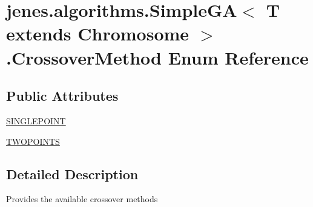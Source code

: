 \hypertarget{enumjenes_1_1algorithms_1_1_simple_g_a_3_01_t_01extends_01_chromosome_01_4_1_1_crossover_method}{\section{jenes.\-algorithms.\-Simple\-G\-A$<$ T extends Chromosome $>$.Crossover\-Method Enum Reference}
\label{enumjenes_1_1algorithms_1_1_simple_g_a_3_01_t_01extends_01_chromosome_01_4_1_1_crossover_method}
}
\subsection*{Public Attributes}
\begin{DoxyCompactItemize}
\item 
\hyperlink{enumjenes_1_1algorithms_1_1_simple_g_a_3_01_t_01extends_01_chromosome_01_4_1_1_crossover_method_a0dba044ab40298639e47034fda066ece}{S\-I\-N\-G\-L\-E\-P\-O\-I\-N\-T}
\item 
\hyperlink{enumjenes_1_1algorithms_1_1_simple_g_a_3_01_t_01extends_01_chromosome_01_4_1_1_crossover_method_ad25c14da6b790cbaeac60e7b0a619144}{T\-W\-O\-P\-O\-I\-N\-T\-S}
\end{DoxyCompactItemize}


\subsection{Detailed Description}
Provides the available crossover methods 

